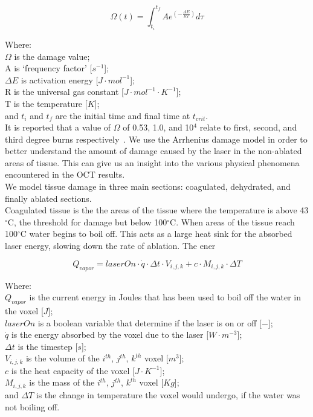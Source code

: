 \begin{equation}
\Omega(t)=\int^{t_{f}}_{t_i} Ae^{(-\tfrac{\Delta E}{RT})}d\tau
\end{equation}


\noindent Where:\\
	\indent $\Omega$ is the damage value; \\
	\indent A is `frequency factor' [$s^{-1}$];\\
	\indent $\Delta E$ is activation energy [$J\cdot mol^{-1}$];\\
	\indent R is the universal gas constant [$J\cdot mol^{-1}\cdot K^{-1}$];\\
	\indent T is the temperature [$K$];\\
	\indent and $t_i$ and $t_f$ are the initial time and final time at $t_{crit}$.\\

It is reported that a value of $\Omega$ of 0.53, 1.0, and 10$^4$ relate to first, second, and third degree burns respectively~\cite{diller1983finite}. We use the Arrhenius damage model in order to better understand the amount of damage caused by the laser in the non-ablated areas of tissue. This can give us an insight into the various physical phenomena encountered in the OCT results.\\

We model tissue damage in three main sections: coagulated, dehydrated, and finally ablated sections.\\

Coagulated tissue is the the areas of the tissue where the temperature is above 43$^{\circ}$C, the threshold for damage but below 100$^{\circ}$C.
When areas of the tissue reach 100$^{\circ}$C water begins to boil off. This acts as a large heat sink for the absorbed laser energy, slowing down the rate of ablation. The ener

\begin{equation}
Q_{vapor}=laserOn\cdot\dot{q}\cdot \Delta t\cdot V_{i,j,k} + c\cdot M_{i,j,k}\cdot\Delta T
\end{equation}

\noindent Where:\\
	\indent $Q_{vapor}$ is the current energy in Joules that has been used to boil off the water in the voxel [$J$];\\
	\indent $laserOn$ is a boolean variable that determine if the laser is on or off [$-$];\\
	\indent $\dot{q}$ is the energy absorbed by the voxel due to the laser [$W\cdot m^{-3}$];\\
	\indent $\Delta t$ is the timestep [$s$];\\
	\indent $V_{i,j,k}$ is the volume of the $i^{th}$, $j^{th}$, $k^{th}$ voxel [$m^3$];\\
	\indent $c$ is the heat capacity of the voxel [$J\cdot K^{-1}$];\\
	\indent $M_{i,j,k}$ is the mass of the $i^{th}$, $j^{th}$, $k^{th}$ voxel [$Kg$];\\
	\indent and $\Delta T$ is the change in temperature the voxel would undergo, if the water was not boiling off.\\
	
